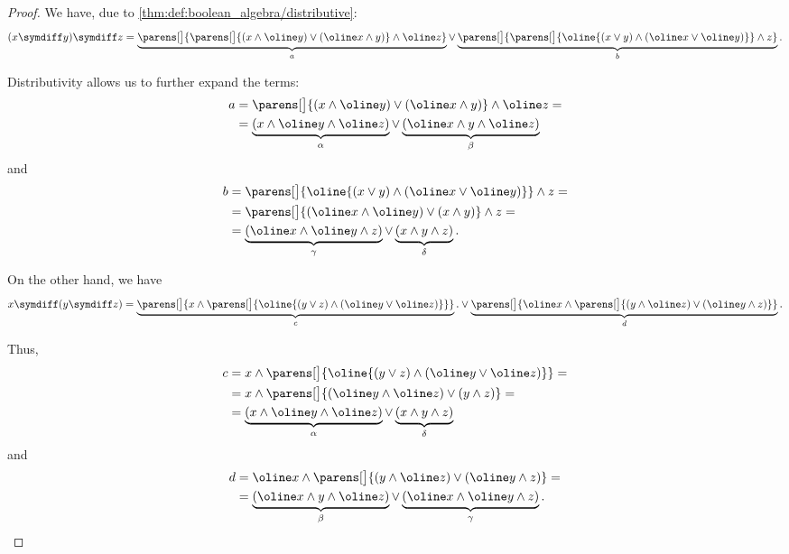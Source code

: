 \begin{proof}
   We have, due to \cref{thm:def:boolean_algebra/distributive}:
  \begin{equation*}
    (x \symdiff y) \symdiff z
    =
    \underbrace{ \parens[\big]{\parens[\big]{ (x \wedge \oline y) \vee (\oline x \wedge y) } \wedge \oline z } }_a
    \vee
    \underbrace{ \parens[\big]{\parens[\big]{ \oline{(x \vee y) \wedge (\oline x \vee \oline y)} } \wedge z } }_b.
  \end{equation*}

  Distributivity allows us to further expand the terms:
  \begin{align*}
    a
    &=
    \parens[\big]{ (x \wedge \oline y) \vee (\oline x \wedge y) } \wedge \oline z
    = \\ &=
    \underbrace{(x \wedge \oline y \wedge \oline z)}_\alpha \vee \underbrace{(\oline x \wedge y \wedge \oline z)}_\beta
  \end{align*}
  and
  \begin{align*}
    b
    &=
    \parens[\big]{ \oline{(x \vee y) \wedge (\oline x \vee \oline y)} } \wedge z
    = \\ &=
    \parens[\big]{ (\oline x \wedge \oline y) \vee (x \wedge y) } \wedge z
    = \\ &=
    \underbrace{(\oline x \wedge \oline y \wedge z)}_\gamma \vee \underbrace{(x \wedge y \wedge z)}_\delta.
  \end{align*}

  On the other hand, we have
  \begin{equation*}
    x \symdiff (y \symdiff z)
    =
    \underbrace{ \parens[\big]{ x \wedge \parens[\big]{ \oline{(y \vee z) \wedge (\oline y \vee \oline z)} } } }_c.
    \vee
    \underbrace{ \parens[\big]{ \oline x \wedge \parens[\big]{ (y \wedge \oline z) \vee (\oline y \wedge z) } } }_d.
  \end{equation*}

  Thus,
  \begin{align*}
    c
    &=
    x \wedge \parens[\big]{ \oline{(y \vee z) \wedge (\oline y \vee \oline z)} }
    = \\ &=
    x \wedge \parens[\big]{ (\oline y \wedge \oline z) \vee (y \wedge z)}
    = \\ &=
    \underbrace{(x \wedge \oline y \wedge \oline z)}_\alpha \vee \underbrace{(x \wedge y \wedge z)}_\delta
  \end{align*}
  and
  \begin{align*}
    d
    &=
    \oline x \wedge \parens[\big]{ (y \wedge \oline z) \vee (\oline y \wedge z) }
    = \\ &=
    \underbrace{(\oline x \wedge y \wedge \oline z)}_\beta \vee \underbrace{(\oline x \wedge \oline y \wedge z)}_\gamma.
  \end{align*}


\end{proof}
